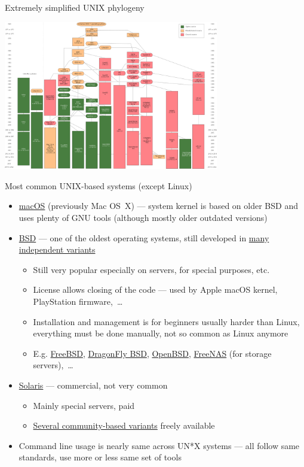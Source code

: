 \documentclass[compress, ucs, xelatex, 11pt, xcolor=svgnames, aspectratio=169,
	hyperref={
		bookmarks=true,
		unicode=true,
		colorlinks=true,
		pdftitle={Linux, command line and MetaCentrum},
		plainpages=false,
		pdfauthor={Vojtech Zeisek},
		pdfsubject={Course about use of Linux command line, writing shell scripts and using MetaCentrum of CESNET},
		pdfcreator={XeLaTeX},
		pdfkeywords={Linux, GNU, BASH, shell, command line, MetaCentrum},
		linkcolor=DarkRed, %
		anchorcolor=DarkBlue, %
		citecolor=Indigo, %
		filecolor=NavyBlue, %
		menucolor=DarkMagenta, %
		urlcolor=DarkBlue, %
		pdftex},
	url={hyphens, lowtilde} %
	]{beamer}
\begin{document}
\begin{frame}{Extremely simplified UNIX phylogeny}
	\begin{center}
		\includegraphics[height=6.5cm]{unix_history-simple.png}
	\end{center}
\end{frame}

\begin{frame}{Most common UNIX-based systems (except Linux)}
	\begin{itemize}
		\item \href{https://en.wikipedia.org/wiki/macOS}{macOS} (previously Mac OS~X) --- system kernel is based on older BSD and uses plenty of GNU tools (although mostly older outdated versions)
		\item \href{https://en.wikipedia.org/wiki/Berkeley_Software_Distribution}{BSD} --- one of the oldest operating systems, still developed in \href{https://distrowatch.com/search.php?ostype=BSD}{many independent variants}
		\begin{itemize}
			\item Still very popular especially on servers, for special purposes, etc.
			\item License allows closing of the code --- used by Apple macOS kernel, PlayStation firmware,~\ldots
			\item Installation and management is for beginners usually harder than Linux, everything must be done manually, not so common as Linux anymore
			\item E.g. \href{https://www.freebsd.org/}{FreeBSD}, \href{https://www.dragonflybsd.org/}{DragonFly BSD}, \href{https://www.openbsd.org/}{OpenBSD}, \href{https://www.freenas.org/}{FreeNAS} (for storage servers),~\ldots
		\end{itemize}
		\item \href{https://en.wikipedia.org/wiki/Solaris_(operating_system)}{Solaris} --- commercial, not very common
		\begin{itemize}
			\item Mainly special servers, paid
			\item \href{https://distrowatch.com/search.php?ostype=Solaris}{Several community-based variants} freely available
		\end{itemize}
		\item Command line usage is nearly same across UN*X systems --- all follow same standards, use more or less same set of tools
	\end{itemize}
\end{frame}
\end{document}
